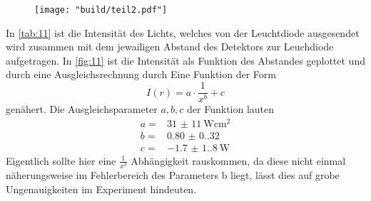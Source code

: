 \begin{figure}[H]
    \caption{}
    \label{fig:11}
    \centering
    \texttt{[image: "build/teil2.pdf"]}
\end{figure}
In \autoref{tab:11} ist die Intensität des Lichts, welches von der Leuchtdiode ausgesendet wird 
zusammen mit dem jewailigen Abstand des Detektors zur Leuchdiode aufgetragen. In \autoref{fig:11}
ist die Intensität als Funktion des Abstandes geplottet und durch eine Ausgleichsrechnung 
durch Eine Funktion der Form 
\begin{equation}
    I \left(r\right) = a \cdot \frac{1}{x^b} + c
\end{equation}
genähert.
Die Ausgleichsparameter $a, b, c$ der Funktion lauten
\begin{align*}
    a = & \qty{31(11)}{\watt\centi\meter\squared}   \\
    b = & \qty{0.80(0.32)}{}     \\
    c = & \qty{-1.7(1.8)}{\watt}       
\end{align*}
Eigentlich sollte hier eine $\frac{1}{x^2}$ Abhängigkeit rauskommen, da diese nicht einmal 
näherungsweise im Fehlerbereich des Parameters b liegt, lässt dies auf grobe Ungenauigkeiten
im Experiment hindeuten.

\label{sec:Auswertung}
